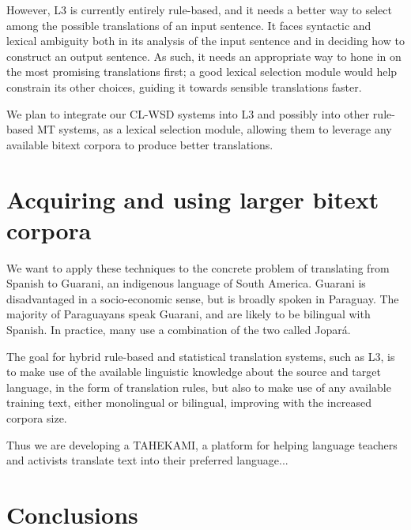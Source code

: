 \documentclass{article}
\begin{document}
However, L3 is currently entirely rule-based, and it needs a better way to
select among the possible translations of an input sentence. It faces
syntactic and lexical ambiguity both in its analysis of the input sentence and
in deciding how to construct an output sentence. As such, it needs an
appropriate way to hone in on the most promising translations first; a good
lexical selection module would help constrain its other choices, guiding it
towards sensible translations faster.

We plan to integrate our CL-WSD systems into L3 and possibly into other
rule-based MT systems, as a lexical selection module, allowing them to leverage
any available bitext corpora to produce better translations.

\section{Acquiring and using larger bitext corpora}
We want to apply these techniques to the concrete problem of translating from
Spanish to Guarani, an indigenous language of South America. Guarani is
disadvantaged in a socio-economic sense, but is broadly spoken in Paraguay. The
majority of Paraguayans speak Guarani, and are likely to be bilingual with
Spanish. In practice, many use a combination of the two called Jopar{\'a}.

The goal for hybrid rule-based and statistical translation systems, such as L3,
is to make use of the available linguistic knowledge about the source and
target language, in the form of translation rules, but also to make use of any
available training text, either monolingual or bilingual, improving with the
increased corpora size.

Thus we are developing a TAHEKAMI, a platform for helping language teachers and
activists translate text into their preferred language...

\section{Conclusions}
\end{document}
